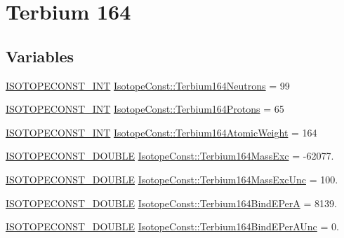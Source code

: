 \hypertarget{group___isotope_const-_terbium-_tb164}{}\section{Terbium 164}
\label{group___isotope_const-_terbium-_tb164}
\subsection*{Variables}
\begin{DoxyCompactItemize}
\item 
\mbox{\hyperlink{group___isotope_const-_macros_ga5f18360b3e99483a35c32d789e62621c}{I\+S\+O\+T\+O\+P\+E\+C\+O\+N\+S\+T\+\_\+\+I\+NT}} \mbox{\hyperlink{group___isotope_const-_terbium-_tb164_gaaac5300114b835d283e255d804b44bd4}{Isotope\+Const\+::\+Terbium164\+Neutrons}} = 99
\item 
\mbox{\hyperlink{group___isotope_const-_macros_ga5f18360b3e99483a35c32d789e62621c}{I\+S\+O\+T\+O\+P\+E\+C\+O\+N\+S\+T\+\_\+\+I\+NT}} \mbox{\hyperlink{group___isotope_const-_terbium-_tb164_ga6187e42939afd55b7e2ddd113ec4407d}{Isotope\+Const\+::\+Terbium164\+Protons}} = 65
\item 
\mbox{\hyperlink{group___isotope_const-_macros_ga5f18360b3e99483a35c32d789e62621c}{I\+S\+O\+T\+O\+P\+E\+C\+O\+N\+S\+T\+\_\+\+I\+NT}} \mbox{\hyperlink{group___isotope_const-_terbium-_tb164_ga6a8089039891dc6c1c3aeaec4c45f3ba}{Isotope\+Const\+::\+Terbium164\+Atomic\+Weight}} = 164
\item 
\mbox{\hyperlink{group___isotope_const-_macros_ga8f45a7272ce02c0b4c65c44636ed719a}{I\+S\+O\+T\+O\+P\+E\+C\+O\+N\+S\+T\+\_\+\+D\+O\+U\+B\+LE}} \mbox{\hyperlink{group___isotope_const-_terbium-_tb164_ga96b0805faa79a9b6fb068d0198a4368a}{Isotope\+Const\+::\+Terbium164\+Mass\+Exc}} = -\/62077.
\item 
\mbox{\hyperlink{group___isotope_const-_macros_ga8f45a7272ce02c0b4c65c44636ed719a}{I\+S\+O\+T\+O\+P\+E\+C\+O\+N\+S\+T\+\_\+\+D\+O\+U\+B\+LE}} \mbox{\hyperlink{group___isotope_const-_terbium-_tb164_ga3489d13b1e37b7dca0f5d69a50521ee6}{Isotope\+Const\+::\+Terbium164\+Mass\+Exc\+Unc}} = 100.
\item 
\mbox{\hyperlink{group___isotope_const-_macros_ga8f45a7272ce02c0b4c65c44636ed719a}{I\+S\+O\+T\+O\+P\+E\+C\+O\+N\+S\+T\+\_\+\+D\+O\+U\+B\+LE}} \mbox{\hyperlink{group___isotope_const-_terbium-_tb164_ga158fa91093ff1fc35e9f4d7c12ab9b42}{Isotope\+Const\+::\+Terbium164\+Bind\+E\+PerA}} = 8139.
\item 
\mbox{\hyperlink{group___isotope_const-_macros_ga8f45a7272ce02c0b4c65c44636ed719a}{I\+S\+O\+T\+O\+P\+E\+C\+O\+N\+S\+T\+\_\+\+D\+O\+U\+B\+LE}} \mbox{\hyperlink{group___isotope_const-_terbium-_tb164_ga5f3f7881969fa0da07c7e99b817cd8c0}{Isotope\+Const\+::\+Terbium164\+Bind\+E\+Per\+A\+Unc}} = 0.

\end{DoxyCompactItemize}
